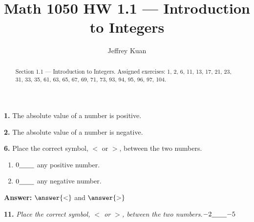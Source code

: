 \documentclass{ximera}
\author{Jeffrey Kuan}
\title{Math 1050 HW 1.1 --- Introduction to Integers}
\begin{document}
\begin{abstract}
    Section 1.1 --- Introduction to Integers.
    Assigned exercises: 1, 2, 6, 11, 13, 17, 21, 23, 31, 33, 35, 61, 63, 65, 67, 69, 71, 73, 93, 94, 95, 96, 97, 104.
\end{abstract}

\maketitle

\begin{problem}
\textbf{1.} The absolute value of a number is positive.

\begin{multipleChoice}
\end{multipleChoice}
\end{problem}

\begin{problem}
\textbf{2.} The absolute value of a number is negative.

\begin{multipleChoice}
\end{multipleChoice}
\end{problem}

\begin{problem}
\textbf{6.} Place the correct symbol, $<$ or $>$, between the two numbers.
  \begin{enumerate}[label=\textbf{\alph*.},leftmargin=2em,topsep=2pt,itemsep=1pt]
    \item $0 \underline{\hspace{2.2em}}$ any positive number.
    \item $0 \underline{\hspace{2.2em}}$ any negative number.
  \end{enumerate}

\textbf{Answer:} $\answer{<}$ and $\answer{>}$
\end{problem}

\begin{problem}
\textbf{11.} \emph{Place the correct symbol, $<$ or $>$, between the two numbers.}\quad $-2 \underline{\hspace{2.2em}} {-5}$

\begin{multipleChoice}
\choice{$<$}
\choice[correct]{$>$}
\end{multipleChoice}
\end{problem}
\end{document}
